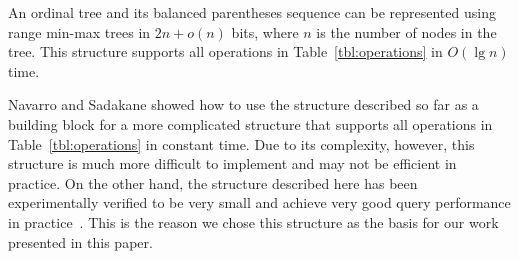 \begin{lemma}\label{lem:lg}
  An ordinal tree and its balanced parentheses sequence can be represented using
  range min-max trees in $2n + o(n)$ bits, where $n$ is the number of nodes in
  the tree.
  This structure supports all operations in Table~\ref{tbl:operations} in
  $O(\lg n)$ time.
\end{lemma}

Navarro and Sadakane showed how to use the structure described so far as a
building block for a more complicated structure that supports all operations in
Table~\ref{tbl:operations} in constant time.
Due to its complexity, however, this structure is much more difficult to
implement and may not be efficient in practice.
On the other hand, the structure described here has been experimentally verified
to be very small and achieve very good query performance in
practice~\cite{ACNSalenex10}.
This is the reason we chose this structure as the basis for our work presented
in this paper.
